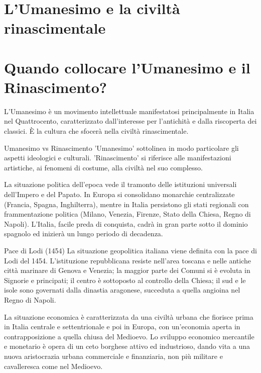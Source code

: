 \documentclass[12pt]{article}
\begin{document}
\section{L'Umanesimo e la civiltà rinascimentale}


\section{Quando collocare l'Umanesimo e il Rinascimento?}


L'Umanesimo è un movimento intellettuale manifestatosi principalmente in Italia nel Quattrocento, caratterizzato dall'interesse per l'antichità e dalla riscoperta dei classici. È la cultura che sfocerà nella civiltà rinascimentale.


\begin{defn}{Umanesimo vs Rinascimento}
'Umanesimo' sottolinea in modo particolare gli aspetti ideologici e culturali. 'Rinascimento' si riferisce alle manifestazioni artistiche, ai fenomeni di costume, alla civiltà nel suo complesso.
\end{defn}


La situazione politica dell'epoca vede il tramonto delle istituzioni universali dell'Impero e del Papato. In Europa si consolidano monarchie centralizzate (Francia, Spagna, Inghilterra), mentre in Italia persistono gli stati regionali con frammentazione politica (Milano, Venezia, Firenze, Stato della Chiesa, Regno di Napoli). L'Italia, facile preda di conquista, cadrà in gran parte sotto il dominio spagnolo ed inizierà un lungo periodo di decadenza.


\begin{defn}{Pace di Lodi (1454)}
La situazione geopolitica italiana viene definita con la pace di Lodi del 1454. L'istituzione repubblicana resiste nell'area toscana e nelle antiche città marinare di Genova e Venezia; la maggior parte dei Comuni si è evoluta in Signorie e principati; il centro è sottoposto al controllo della Chiesa; il sud e le isole sono governati dalla dinastia aragonese, succeduta a quella angioina nel Regno di Napoli.
\end{defn}


La situazione economica è caratterizzata da una civiltà urbana che fiorisce prima in Italia centrale e settentrionale e poi in Europa, con un'economia aperta in contrapposizione a quella chiusa del Medioevo. Lo sviluppo economico mercantile e monetario è opera di un ceto borghese attivo ed industrioso, dando vita a una nuova aristocrazia urbana commerciale e finanziaria, non più militare e cavalleresca come nel Medioevo.
\end{document}
